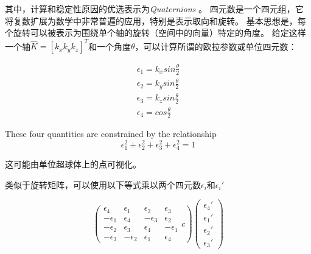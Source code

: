 其中，计算和稳定性原因的优选表示为\emph {Quaternions} 。 四元数是一个四元组，它将复数扩展为数学中非常普遍的应用，特别是表示取向和旋转。 基本思想是，每个旋转可以被表示为围绕单个轴的旋转（空间中的向量）特定的角度。 给定这样一个轴$ \hat {K} = [k_x k_y k_z]^ T $和一个角度$ \theta $，可以计算所谓的欧拉参数或单位四元数：

\begin{eqnarray}
\epsilon_1=k_x sin \frac{\theta}{2}\\
\epsilon_2=k_y sin \frac{\theta}{2}\\
\epsilon_3=k_z sin \frac{\theta}{2}\\
\epsilon_4=cos\frac{\theta}{2}
\end{eqnarray}

These four quantities are constrained by the relationship
\begin{equation}
\epsilon_1^2+\epsilon_2^2+\epsilon_3^2+\epsilon_4^2=1
\end{equation}

这可能由单位超球体上的点可视化。


类似于旋转矩阵，可以使用以下等式乘以两个四元数$ \epsilon_i $和$ \epsilon_i'$

\begin{equation}
\left(
\begin{array}{cccc}
\epsilon_4 & \epsilon_1 & \epsilon_2 & \epsilon_3\\
-\epsilon_1 & \epsilon_4 & -\epsilon_3 & \epsilon_2\\
-\epsilon_2 & \epsilon_3 & \epsilon_4 & -\epsilon_1\\
-\epsilon_3 & -\epsilon_2 & \epsilon_1 & \epsilon_4
\end{array}{c}
\right)
\left(\begin{array}{c}\epsilon_4'\\\epsilon_1'\\\epsilon_2'\\\epsilon_3'\end{array}\right)
\end{equation}

